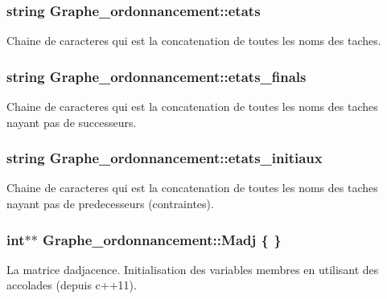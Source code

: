 \subsubsection[{\texorpdfstring{etats}{etats}}]{\setlength{\rightskip}{0pt plus 5cm}string Graphe\+\_\+ordonnancement\+::etats}\hypertarget{structGraphe__ordonnancement_ab49a7a92f5595848655c34ee6cb71233}{}\label{structGraphe__ordonnancement_ab49a7a92f5595848655c34ee6cb71233}
Chaine de caracteres qui est la concatenation de toutes les noms des taches. 
\subsubsection[{\texorpdfstring{etats\+\_\+finals}{etats_finals}}]{\setlength{\rightskip}{0pt plus 5cm}string Graphe\+\_\+ordonnancement\+::etats\+\_\+finals}\hypertarget{structGraphe__ordonnancement_a4329a36bd10f27bb0076557a1a8f3029}{}\label{structGraphe__ordonnancement_a4329a36bd10f27bb0076557a1a8f3029}
Chaine de caracteres qui est la concatenation de toutes les noms des taches n\textquotesingle{}ayant pas de successeurs. 
\subsubsection[{\texorpdfstring{etats\+\_\+initiaux}{etats_initiaux}}]{\setlength{\rightskip}{0pt plus 5cm}string Graphe\+\_\+ordonnancement\+::etats\+\_\+initiaux}\hypertarget{structGraphe__ordonnancement_afd7e0bf2bd8319f8b30467ee6759f3a0}{}\label{structGraphe__ordonnancement_afd7e0bf2bd8319f8b30467ee6759f3a0}
Chaine de caracteres qui est la concatenation de toutes les noms des taches n\textquotesingle{}ayant pas de predecesseurs (contraintes). 
\subsubsection[{\texorpdfstring{Madj}{Madj}}]{\setlength{\rightskip}{0pt plus 5cm}int$\ast$$\ast$ Graphe\+\_\+ordonnancement\+::\+Madj \{ \}}\hypertarget{structGraphe__ordonnancement_a0088470c31eb4a734f8cbf3ef6906ad6}{}\label{structGraphe__ordonnancement_a0088470c31eb4a734f8cbf3ef6906ad6}
La matrice d\textquotesingle{}adjacence. Initialisation des variables membres en utilisant des accolades (depuis c++11). 
